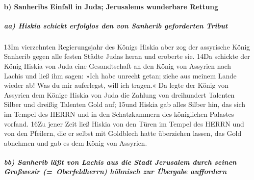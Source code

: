 \hypertarget{b-sanheribs-einfall-in-juda-jerusalems-wunderbare-rettung}{%
\paragraph{b) Sanheribs Einfall in Juda; Jerusalems wunderbare
Rettung}\label{b-sanheribs-einfall-in-juda-jerusalems-wunderbare-rettung}}

\hypertarget{aa-hiskia-schickt-erfolglos-den-von-sanherib-geforderten-tribut}{%
\subparagraph{aa) Hiskia schickt erfolglos den von Sanherib geforderten
Tribut}\label{aa-hiskia-schickt-erfolglos-den-von-sanherib-geforderten-tribut}}

13Im vierzehnten Regierungsjahr des Königs Hiskia aber zog der
assyrische König Sanherib gegen alle festen Städte Judas heran und
eroberte sie. 14Da schickte der König Hiskia von Juda eine Gesandtschaft
an den König von Assyrien nach Lachis und ließ ihm sagen: »Ich habe
unrecht getan; ziehe aus meinem Lande wieder ab! Was du mir auferlegst,
will ich tragen.« Da legte der König von Assyrien dem Könige Hiskia von
Juda die Zahlung von dreihundert Talenten Silber und dreißig Talenten
Gold auf; 15und Hiskia gab alles Silber hin, das sich im Tempel des
HERRN und in den Schatzkammern des königlichen Palastes vorfand. 16Zu
jener Zeit ließ Hiskia von den Türen im Tempel des HERRN und von den
Pfeilern, die er selbst mit Goldblech hatte überziehen lassen, das Gold
abnehmen und gab es dem König von Assyrien.

\hypertarget{bb-sanherib-luxe4uxdft-von-lachis-aus-die-stadt-jerusalem-durch-seinen-grouxdfwesir-oberfeldherrn-huxf6hnisch-zur-uxfcbergabe-auffordern}{%
\subparagraph{bb) Sanherib läßt von Lachis aus die Stadt Jerusalem durch
seinen Großwesir (=~Oberfeldherrn) höhnisch zur Übergabe
auffordern}\label{bb-sanherib-luxe4uxdft-von-lachis-aus-die-stadt-jerusalem-durch-seinen-grouxdfwesir-oberfeldherrn-huxf6hnisch-zur-uxfcbergabe-auffordern}}


